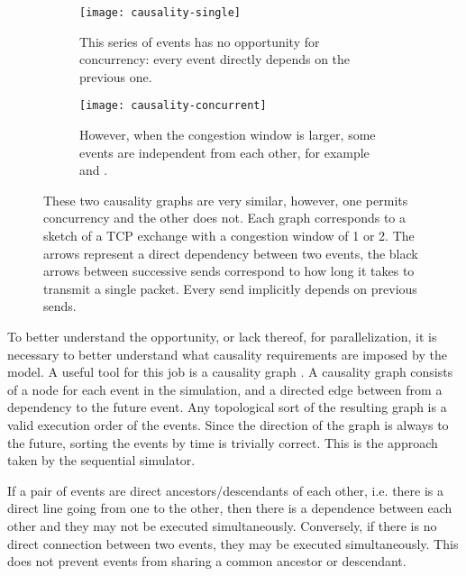 \begin{figure}
    \centering
    \begin{subfigure}[t]{0.45\textwidth}
        \centering
        \texttt{[image: causality-single]}
        \caption{
            This series of events has no opportunity for concurrency: every event directly depends on the previous one.
        }
        \label{causality-graph-seq:fig}
    \end{subfigure}
    \begin{subfigure}[t]{0.45\textwidth}
        \centering
        \texttt{[image: causality-concurrent]}
        \caption{
            However, when the congestion window is larger, some events are independent from each other, for example  and . 
        }
        \label{causality-graph-para:fig}
    \end{subfigure}
    \caption{
        These two causality graphs are very similar, however, one permits concurrency and the other does not.
        Each graph corresponds to a sketch of a TCP exchange with a congestion window of 1 or 2.
        The arrows represent a direct dependency between two events, the black arrows between successive sends correspond to how long it takes to transmit a single packet.
        Every send implicitly depends on previous sends.
    }
    \label{causality-graph:fig}
\end{figure}

To better understand the opportunity, or lack thereof, for parallelization, it is necessary to better understand what causality requirements are imposed by the model.
A useful tool for this job is a causality graph \cite{misra_distributed_1986}.
A causality graph consists of a node for each event in the simulation, and a directed edge between from a dependency to the future event.
Any topological sort of the resulting graph is a valid execution order of the events.
Since the direction of the graph is always to the future, sorting the events by time is trivially correct.
This is the approach taken by the sequential simulator.

If a pair of events are direct ancestors/descendants of each other, i.e. there is a direct line going from one to the other, then there is a dependence between each other and they may not be executed simultaneously.
Conversely, if there is no direct connection between two events, they may be executed simultaneously.
This does not prevent events from sharing a common ancestor or descendant.

